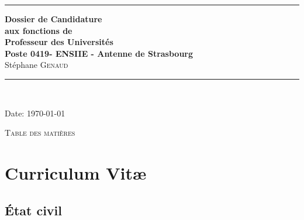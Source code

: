 \documentclass[11pt]{article}
\begin{document}
\thispagestyle{empty}




\rule{\linewidth}{1mm}
\begin{center}
\Large{\textbf{Dossier de Candidature\\
aux fonctions de \\
Professeur des Universités\\
Poste 0419- ENSIIE - Antenne de Strasbourg}}\\[5mm]
\Large{Stéphane \textsc{Genaud}}\\[1cm]

\rule{\linewidth}{1mm}
\\
\vspace{3cm}
\end{center}
\begin{center}
Date: \today\\
\end{center}

\newpage
\mbox{}%

\setlength{\parindent}{5mm} %
\setlength{\parindent}{0mm}
\newpage


\begin{center}
\huge{\textsc{Table des matières}}
\end{center}
\vspace{2cm}


\tableofcontents

\noindent


\newpage

\newcommand{\mysf}{\sectionfont}
\sectionfont{\sectionrule{3ex}{0pt}{-1ex}{2pt}}
\subsectionfont{\sectionrule{1ex}{0pt}{-1ex}{1pt}}


\section{Curriculum Vit{\ae}}

\setlength{\tabcolsep}{5pt}

\subsection{\'Etat civil}
\end{document}

